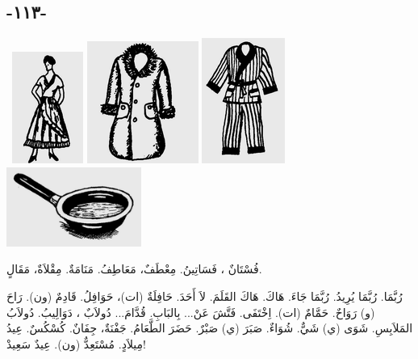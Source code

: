\documentclass[a5paper]{article}
\begin{document}
\subsection{-١١٣-}
\  \includegraphics[width=0.9165in,height=1.4374in]{images/MuhammadBagauddinprettified-img301.png}   \includegraphics[width=1.4374in,height=1.5728in]{images/MuhammadBagauddinprettified-img302.png}   \includegraphics[width=1.0728in,height=1.6146in]{images/MuhammadBagauddinprettified-img303.png}   \includegraphics[width=1.7398in,height=1.0209in]{images/MuhammadBagauddinprettified-img304.png}  

فُسْتَانٌ ، فَسَاتِينُ. مِعْطَفٌ، مَعَاطِفُ. مَنَامَةٌ. مِقْلاَةٌ، مَقَالٍ. 

رُبَّمَا. رُبَّمَا يُرِيدُ. رُبَّمَا جَاءَ. هَاكَ. هَاكَ القَلَمَ. لاَ أَحَدَ. حَافِلَةٌ (ات)، حَوَافِلُ. قَادِمٌ (ون). رَاحَ (و) رَوَاحٌ. حَمَّامٌ (ات). اِخْتَفَى. فَتَّشَ عَنْ... بِالبَابِ. قُدَّامَ... دُولاَبٌ ، دَوَالِيبُ. دُولاَبُ المَلاَبِسِ. شَوَى (ي) شَيٌّ. شُوَاءٌ. صَبَرَ (ي) صَبْرٌ. حَضَرَ الطَّعَامُ. جَفْنَةٌ، جِفَانٌ. كُسْكُسٌ. عِيدُ مِيلاَدٍ. مُسْتَعِدٌّ (ون). عِيدٌ سَعِيدْ!
\end{document}
